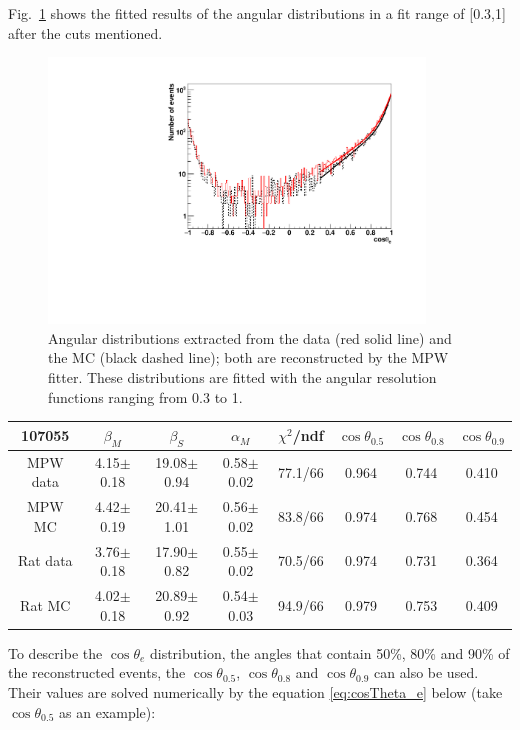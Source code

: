 Fig.~\ref{angularResolMPW} shows the fitted results of the angular distributions in a fit range of [0.3,1] after the cuts mentioned. 
\begin{figure}
	\centering
	\includegraphics[width=10cm]{16NangularResol.pdf}
	\caption{Angular distributions extracted from the data (red solid line) and the MC (black dashed line); both are reconstructed by the MPW fitter. These distributions are fitted with the angular resolution functions ranging from 0.3 to 1.}
	\label{angularResolMPW}
\end{figure}

\begin{table}[ht]
	\begin{tabular}{cccccccc}%
		\toprule
	107055& $\beta_M$ &  $\beta_S$ & $\alpha_M$ & $\chi^2$/ndf & $\cos\theta_{0.5}$ & $\cos\theta_{0.8}$& $\cos\theta_{0.9}$\\
	\hline
	MPW data & 4.15$\pm$0.18 & 19.08$\pm$0.94 & 0.58$\pm$0.02 & 77.1/66 & 0.964 & 0.744 & 0.410 \\
	MPW MC & 4.42$\pm$0.19 & 20.41$\pm$1.01 & 0.56$\pm$0.02 & 83.8/66 & 0.974 & 0.768 & 0.454	 \\	
\hline
	Rat data & 3.76$\pm$0.18 & 17.90$\pm$0.82 & 0.55$\pm$0.02 & 70.5/66 & 0.974 & 0.731 & 0.364 \\
	Rat MC & 4.02$\pm$0.18 & 20.89$\pm$0.92 & 0.54$\pm$0.03 & 94.9/66 & 0.979 & 0.753 & 0.409	\\
		\bottomrule
	\end{tabular}
	\label{angularResolValuesUpdated}
\end{table}

To describe the $\cos\theta_e$ distribution, the angles that contain 50\%, 80\%
and 90\% of the reconstructed events, the $\cos\theta_{0.5}$, $\cos\theta_{0.8}$ and $\cos\theta_{0.9}$ can also be used. Their values are solved numerically by the equation \ref{eq:cosTheta_e} below (take $\cos\theta_{0.5}$ as an example):


